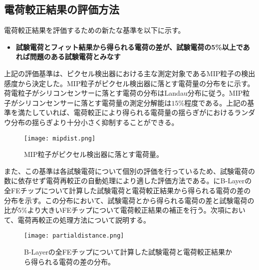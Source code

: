 \subsection{電荷較正結果の評価方法}
電荷較正結果を評価するための新たな基準を以下に示す。
\begin{itemize}
  \item[]\textbf{試験電荷とフィット結果から得られる電荷の差が、試験電荷の5\%以上であれば問題のある試験電荷とみなす}
\end{itemize}
上記の評価基準は、ピクセル検出器における主な測定対象であるMIP粒子の検出感度から決定した。MIP粒子がピクセル検出器に落とす電荷量の分布をに示す。荷電粒子がシリコンセンサーに落とす電荷の分布はLandau分布に従う。MIP粒子がシリコンセンサーに落とす電荷量の測定分解能は$15\%$程度である。上記の基準を満たしていれば、電荷較正により得られる電荷量の揺らぎがにおけるランダウ分布の揺らぎより十分小さく抑制することができる。

\begin{figure}[tbp]
  \centering
  \texttt{[image: mipdist.png]}
  \caption[MIP粒子がピクセル検出器に落とす電荷量]{MIP粒子がピクセル検出器に落とす電荷量。}
  \label{fig:mipdist}
\end{figure}


また、この基準は各試験電荷について個別の評価を行っているため、試験電荷の数に依存せず電荷再較正の自動処理により適した評価方法である。にB-Layerの全FEチップについて計算した試験電荷と電荷較正結果から得られる電荷の差の分布を示す。この分布において、試験電荷とから得られる電荷の差と試験電荷の比が$5\% $より大きいFEチップについて電荷較正結果の補正を行う。次項において、電荷再較正の処理方法について説明する。

\begin{figure}[tbp]
  \centering
  \texttt{[image: partialdistance.png]}
  \caption[B-Layerの全FEチップについて計算した試験電荷と電荷較正結果から得られる電荷の差の分布]{B-Layerの全FEチップについて計算した試験電荷と電荷較正結果から得られる電荷の差の分布。}
  \label{fig:partialdistance}
\end{figure}


